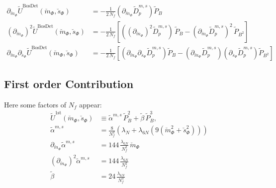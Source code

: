 % 
% 
\begin{align}\label{eq:CEP_derivative_dm_bosonicContribution_rescaled}
 \partial_{\breve m_{\Phi}}  \tilde U^{\text{BosDet}}(\breve m_{\Phi}, \breve s_{\Phi}) & = 
                                  - \frac{1}{2\,N_f} \left( \partial_{\breve m_{\Phi}} \tilde D_p^{m,s} \right) \tilde P_B 
%         
        \\ \label{eq:CEP_derivative_dmdm_bosonicContribution_rescaled}
 \left(\partial_{\breve m_{\Phi}} \right)^2 \tilde U^{\text{BosDet}}(\breve m_{\Phi}, \breve s_{\Phi}) & = 
                                  - \frac{1}{2\,N_f}\left[ \left( \left(\partial_{\breve m_{\Phi}}\right)^2 \tilde D_p^{m,s} \right) \, \tilde P_B
                                  - \left( \partial_{\breve m_{\Phi}} \tilde D_p^{m,s} \right)^2 \, \tilde P_{B^2}    \right]
%               
         \\ \label{eq:CEP_derivative_dmds_bosonicContribution_rescaled}
\partial_{\breve m_{\Phi}} \partial_{\breve s_{\Phi}}  \tilde U^{\text{BosDet}}(\breve m_{\Phi}, \breve s_{\Phi}) & = 
                                  - \frac{1}{2\,N_f} \left[ \left( \partial_{\breve m_{\Phi}} \partial_{\breve s_{\Phi}} \tilde D_p^{m,s} \right) \tilde P_B 
                                  - \left( \partial_{\breve m_{\Phi}}  \tilde D_p^{m,s} \right)\left( \partial_{\breve s_{\Phi}}  \tilde D_p^{m,s} \right)\tilde P_{B^2} \right]
\end{align}
% 
\subsection*{First order Contribution}
Here some factors of $N_f$ appear:
\begin{align}\label{eq:CEP_firstWithDet_shortcuts_rescaled}
 \tilde U^{\text{1st}}(\breve m_{\Phi}, \breve s_{\Phi}) & \equiv \tilde \alpha^{m, s}\, \tilde P_B^2 + \tilde \beta\, \tilde P_B^3,
%  
        \\ \label{CE:CEP_firstWithDet_shrotcut_alpha_rescaled}
 \tilde \alpha^{m, s}  & = \frac{8}{N_f^2} \left(\lambda_N + \lambda_{6N}\left( 9\left( \breve m_{\Phi}^2 + \breve s_{\Phi}^2 \right) \right) \right)
%  
        \\ \label{CE:CEP_firstWithDet_shrotcut_dm_alpha_rescaled}
 \partial_{\breve m_{\Phi}} \tilde \alpha^{m, s}  & = 144\, \frac{\lambda_{6N}}{N_f^2}\, \breve m_{\Phi}
%  
        \\ \label{CE:CEP_firstWithDet_shrotcut_dmdm_alpha_rescaled}
 \left(\partial_{\breve m_{\Phi}}\right)^2 \tilde \alpha^{m, s}  & = 144\, \frac{\lambda_{6N}}{N_f^2}
%  
        \\ \label{CE:CEP_firstWithDet_shrotcut_beta_rescaled}
 \tilde \beta  & = 24\, \frac{\lambda_{6N}}{N_f^3}
\end{align}

